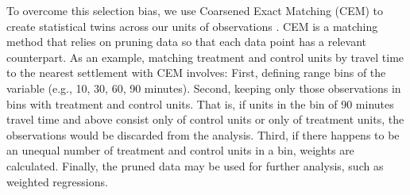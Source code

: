 \documentclass{article}
\begin{document}
To overcome this selection bias, we use Coarsened Exact Matching (CEM) to create statistical twins across our units of observations \citep{iacus2012causal, blackwell2009cem}. CEM is a matching method that relies on pruning data so that each data point has a relevant counterpart. As an example, matching treatment and control units by travel time to the nearest settlement with CEM involves: First, defining range bins of the variable (e.g., 10, 30, 60, 90 minutes). Second, keeping only those observations in bins with treatment and control units. That is, if units in the bin of 90 minutes travel time and above consist only of control units or only of treatment units, the observations would be discarded from the analysis. Third, if there happens to be an unequal number of treatment and control units in a bin, weights are calculated. Finally, the pruned data may be used for further analysis, such as weighted regressions.


\end{document}

